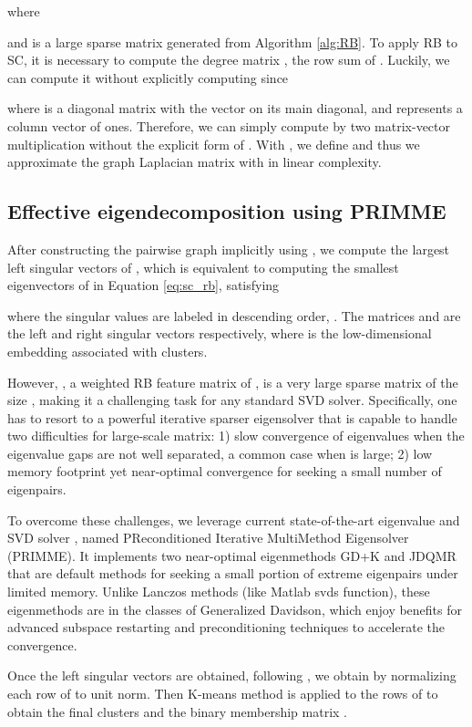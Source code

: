 \documentclass[sigconf]{acmart}
\newcommand{\1}{\boldsymbol{1}}
\newcommand{\0}{\boldsymbol{0}}
\begin{document}
where 

and  is a large sparse  matrix generated from Algorithm \ref{alg:RB}. To apply RB to SC, it is necessary to compute the degree matrix , the row sum of . Luckily, we can compute it without explicitly computing  since
 
where  is a diagonal matrix with the vector  on its main diagonal, and  represents a column vector of ones. Therefore, we can simply compute  by two matrix-vector multiplication without the explicit form of . With , we define  and thus we approximate the graph Laplacian matrix with  in linear complexity.  

\subsection{Effective eigendecomposition using PRIMME}
After constructing the pairwise graph implicitly using , we compute the largest left singular vectors of , which is equivalent to computing the smallest eigenvectors of  in Equation \eqref{eq:sc_rb}, satisfying 

where the singular values are labeled in descending order, . The matrices  and  are the left and right singular vectors respectively, where  is the low-dimensional embedding associated with  clusters. 

However, , a weighted RB feature matrix of , is a very large sparse matrix of the size , making it a challenging task for any standard SVD solver. Specifically, one has to resort to a powerful iterative sparser eigensolver that is capable to handle two difficulties for large-scale matrix: 1) slow convergence of eigenvalues when the eigenvalue gaps are not well separated, a common case when  is large; 2) low memory footprint yet near-optimal convergence for seeking a small number of eigenpairs. 

To overcome these challenges, we leverage current state-of-the-art eigenvalue and SVD solver \cite{stathopoulos2010primme,wu2017primme_svds}, named PReconditioned Iterative MultiMethod Eigensolver (PRIMME). It implements two near-optimal eigenmethods GD+K and JDQMR that are default methods for seeking a small portion of extreme eigenpairs under limited memory. Unlike Lanczos methods (like Matlab svds function), these eigenmethods are in the classes of Generalized Davidson, which enjoy benefits for advanced subspace restarting and preconditioning techniques to accelerate the convergence.   

Once the left singular vectors  are obtained, following  \cite{ng2002spectral}, we obtain  by normalizing each row of  to unit norm. Then K-means method is applied to the rows of  to obtain the final  clusters and the binary membership matrix . 
\end{document}
